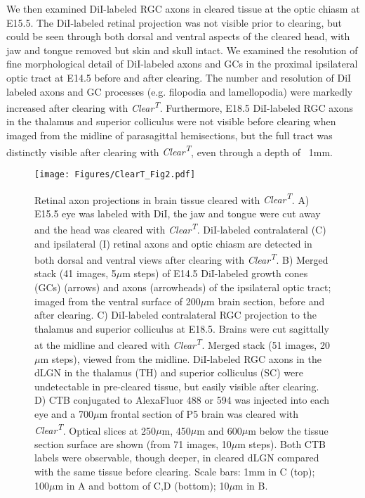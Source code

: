 We then examined DiI-labeled RGC axons in cleared tissue at the optic chiasm at E15.5. %
The DiI-labeled retinal projection was not visible prior to clearing, but could be seen through both dorsal and ventral aspects of the cleared head, with jaw and tongue removed but skin and skull intact. %
We examined the resolution of fine morphological detail of DiI-labeled axons and GCs in the proximal ipsilateral optic tract at E14.5 before and after clearing. %
The number and resolution of DiI labeled axons and GC processes (e.g. filopodia and lamellopodia) were markedly increased after clearing with \emph{Clear\textsuperscript{T}}.%
Furthermore, E18.5 DiI-labeled RGC axons in the thalamus and superior colliculus were not visible before clearing when imaged from the midline of parasagittal hemisections, but the full tract was distinctly visible after clearing with \emph{Clear\textsuperscript{T}}, even through a depth of ~1mm. %
\begin{figure}[hbtp]
    \begin{center}
        \texttt{[image: Figures/ClearT\_Fig2.pdf]}
        \caption[Retinal axon projections in brain tissue cleared with \emph{Clear\textsuperscript{T}}.]
        {Retinal axon projections in brain tissue cleared with \emph{Clear\textsuperscript{T}}.
        A) E15.5 eye was labeled with DiI, the jaw and tongue were cut away and the head was cleared with \emph{Clear\textsuperscript{T}}.
        DiI-labeled contralateral (C) and ipsilateral (I) retinal axons and optic chiasm are detected in both dorsal and ventral views after clearing with \emph{Clear\textsuperscript{T}}.
        B) Merged stack (41 images, 5$\mu$m steps) of E14.5 DiI-labeled growth cones (GCs) (arrows) and axons (arrowheads) of the ipsilateral optic tract; imaged from the ventral surface of 200$\mu$m brain section, before and after clearing.
        C) DiI-labeled contralateral RGC projection to the thalamus and superior colliculus at E18.5.
        Brains were cut sagittally at the midline and cleared with \emph{Clear\textsuperscript{T}}.
        Merged stack (51 images, 20$\mu$m steps), viewed from the midline.
        DiI-labeled RGC axons in the dLGN in the thalamus (TH) and superior colliculus (SC) were undetectable in pre-cleared tissue, but easily visible after clearing.
        D) CTB conjugated to AlexaFluor 488 or 594 was injected into each eye and a 700$\mu$m frontal section of P5 brain was cleared with \emph{Clear\textsuperscript{T}}.
        Optical slices at 250$\mu$m, 450$\mu$m and 600$\mu$m below the tissue section surface are shown (from 71 images, 10$\mu$m steps).
        Both CTB labels were observable, though deeper, in cleared dLGN compared with the same tissue before clearing.
        Scale bars: 1mm in C (top); 100$\mu$m in A and bottom of C,D (bottom); 10$\mu$m in B.
        }
        \label{ClearTFig2}
    \end{center}
\end{figure}

